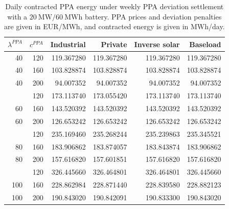 \begin{table}[p]
\centering
\small
\caption{Daily contracted PPA energy under weekly PPA deviation settlement with a $20~\mathrm{MW}/60~\mathrm{MWh}$ battery. PPA prices and deviation penalties are given in EUR/MWh, and contracted energy is given in MWh/day.}
\label{tab:contracted-energy-weekly-p-20-e-60}
\begin{tabular*}{\textwidth}{@{\extracolsep{\fill}}rrrrrr@{}}
\toprule
$\lambda^{PPA}$ & $c^{PPA}$ & Industrial & Private & Inverse solar & Baseload \\
\midrule
40 & 120 & 119.367280 & 119.367280 & 119.367280 & 119.367280 \\
40 & 160 & 103.828874 & 103.828874 & 103.828874 & 103.828874 \\
40 & 200 & 94.007352 & 94.007352 & 94.007352 & 94.007352 \\
\addlinespace
60 & 120 & 173.113740 & 173.055420 & 173.113740 & 173.113740 \\
60 & 160 & 143.520392 & 143.520392 & 143.520392 & 143.520392 \\
60 & 200 & 126.653242 & 126.653242 & 126.653242 & 126.653242 \\
\addlinespace
80 & 120 & 235.169460 & 235.268244 & 235.239863 & 235.345521 \\
80 & 160 & 183.906862 & 183.874057 & 183.843874 & 183.906862 \\
80 & 200 & 157.616820 & 157.601851 & 157.616820 & 157.616820 \\
\addlinespace
100 & 120 & 326.445660 & 326.464801 & 326.464801 & 326.445660 \\
100 & 160 & 228.862984 & 228.871440 & 228.839580 & 228.882123 \\
100 & 200 & 190.843020 & 190.842091 & 190.833300 & 190.843020 \\
\bottomrule
\end{tabular*}
\end{table}
